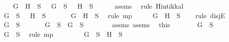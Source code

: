 \begin{isabellebody}
\ \ \isamarkupfalse%
\ {\isachardoublequoteopen}\isactrlbold {\isasymnot}\ {\isacharparenleft}G\ \isactrlbold {\isasymand}\ H{\isacharparenright}\ {\isasymin}\ S\ {\isasymlongrightarrow}\ \isactrlbold {\isasymnot}\ G\ {\isasymin}\ S\ {\isasymor}\ \isactrlbold {\isasymnot}\ H\ {\isasymin}\ S{\isachardoublequoteclose}\isanewline
\ \ \ \ \isamarkupfalse%
\ assms{\isacharparenleft}{}{\isacharparenright}\ \isamarkupfalse%
\ {\isacharparenleft}rule\ Hintikka{\isacharunderscore}l{}{\isacharparenright}\isanewline
\ \ \isamarkupfalse%
\ \isamarkupfalse%
\ {\isachardoublequoteopen}\isactrlbold {\isasymnot}\ G\ {\isasymin}\ S\ {\isasymor}\ \isactrlbold {\isasymnot}\ H\ {\isasymin}\ S{\isachardoublequoteclose}\isanewline
\ \ \ \ \isamarkupfalse%
\ {\isacartoucheopen}\isactrlbold {\isasymnot}\ {\isacharparenleft}G\ \isactrlbold {\isasymand}\ H{\isacharparenright}\ {\isasymin}\ S{\isacartoucheclose}\ \isamarkupfalse%
\ {\isacharparenleft}rule\ mp{\isacharparenright}\isanewline
\ \ \isamarkupfalse%
\ \isamarkupfalse%
\ {\isachardoublequoteopen}G\ \isactrlbold {\isasymand}\ H\ {\isasymnotin}\ S{\isachardoublequoteclose}\isanewline
\ \ \isamarkupfalse%
\ {\isacharparenleft}rule\ disjE{\isacharparenright}\isanewline
\ \ \ \ \isamarkupfalse%
\ {\isachardoublequoteopen}\isactrlbold {\isasymnot}\ G\ {\isasymin}\ S{\isachardoublequoteclose}\isanewline
\ \ \ \ \isamarkupfalse%
\ {\isachardoublequoteopen}\isactrlbold {\isasymnot}\ G\ {\isasymin}\ S\ {\isasymlongrightarrow}\ G\ {\isasymnotin}\ S{\isachardoublequoteclose}\isanewline
\ \ \ \ \ \ \isamarkupfalse%
\ assms{\isacharparenleft}{}{\isacharparenright}\ assms{\isacharparenleft}{}{\isacharparenright}\ \isamarkupfalse%
\ this\isanewline
\ \ \ \ \isamarkupfalse%
\ \isamarkupfalse%
\ {\isachardoublequoteopen}G\ {\isasymnotin}\ S{\isachardoublequoteclose}\isanewline
\ \ \ \ \ \ \isamarkupfalse%
\ {\isacartoucheopen}\isactrlbold {\isasymnot}\ G\ {\isasymin}\ S{\isacartoucheclose}\ \isamarkupfalse%
\ {\isacharparenleft}rule\ mp{\isacharparenright}\isanewline
\ \ \ \ \isamarkupfalse%
\ \isamarkupfalse%
\ {\isachardoublequoteopen}{\isasymnot}\ {\isacharparenleft}G\ {\isasymin}\ S\ {\isasymand}\ H\ {\isasymin}\ S{\isacharparenright}{\isachardoublequoteclose}\isanewline

\end{isabellebody}
